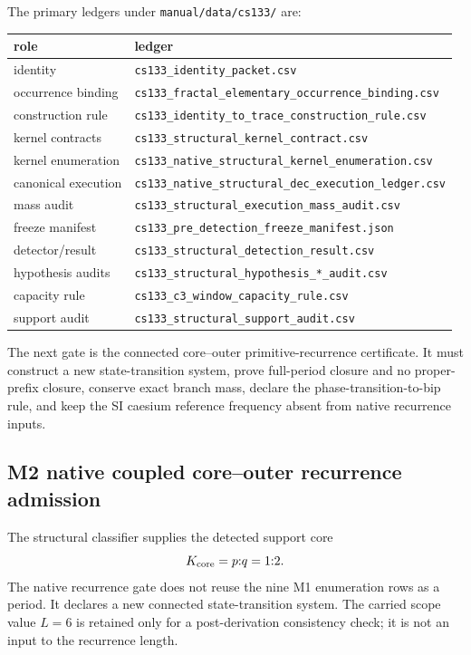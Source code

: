 The primary ledgers under \texttt{manual/data/cs133/} are:
\begin{center}
\begin{tabular}{@{}ll@{}}
\toprule
role & ledger\\
\midrule
identity & \texttt{cs133\_identity\_packet.csv}\\
occurrence binding & \texttt{cs133\_fractal\_elementary\_occurrence\_binding.csv}\\
construction rule & \texttt{cs133\_identity\_to\_trace\_construction\_rule.csv}\\
kernel contracts & \texttt{cs133\_structural\_kernel\_contract.csv}\\
kernel enumeration & \texttt{cs133\_native\_structural\_kernel\_enumeration.csv}\\
canonical execution & \texttt{cs133\_native\_structural\_dec\_execution\_ledger.csv}\\
mass audit & \texttt{cs133\_structural\_execution\_mass\_audit.csv}\\
freeze manifest & \texttt{cs133\_pre\_detection\_freeze\_manifest.json}\\
detector/result & \texttt{cs133\_structural\_detection\_result.csv}\\
hypothesis audits & \texttt{cs133\_structural\_hypothesis\_*\_audit.csv}\\
capacity rule & \texttt{cs133\_c3\_window\_capacity\_rule.csv}\\
support audit & \texttt{cs133\_structural\_support\_audit.csv}\\
\bottomrule
\end{tabular}
\end{center}

The next gate is the connected core--outer primitive-recurrence certificate. It must construct a new state-transition system, prove full-period closure and no proper-prefix closure, conserve exact branch mass, declare the phase-transition-to-bip rule, and keep the SI caesium reference frequency absent from native recurrence inputs.

\subsection{M2 native coupled core--outer recurrence admission}

The structural classifier supplies the detected support core
\[
K_{\rm core}=p{:}q=1{:}2.
\]
The native recurrence gate does not reuse the nine M1 enumeration rows as a
period.  It declares a new connected state-transition system.  The carried
scope value $L=6$ is retained only for a post-derivation consistency check; it
is not an input to the recurrence length.


